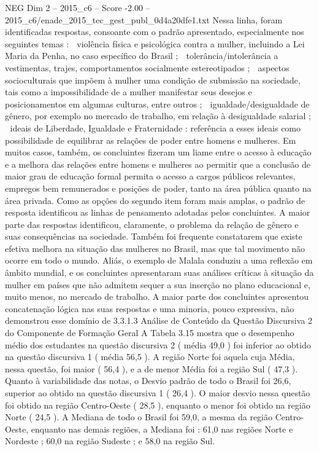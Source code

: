 \begin{textsample}{NEG Dim 2 – 2015\_c6 – Score -2.00 – 2015\_c6/enade\_2015\_tec\_gest\_publ\_0d4a20dfe1.txt}
Nessa linha, foram identificadas respostas, consoante com o padrão apresentado, especialmente nos seguintes temas :  violência física e psicológica contra a mulher, incluindo a Lei Maria da Penha, no caso específico do Brasil ;  tolerância/intolerância a vestimentas, trajes, comportamentos socialmente estereotipados ;  aspectos socioculturais que impõem à mulher uma condição de submissão na sociedade, tais como a impossibilidade de a mulher manifestar seus desejos e posicionamentos em algumas culturas, entre outros ;  igualdade/desigualdade de gênero, por exemplo no mercado de trabalho, em relação à desigualdade salarial ;  ideais de Liberdade, Igualdade e Fraternidade : referência a esses ideais como possibilidade de equilibrar as relações de poder entre homens e mulheres.
Em muitos casos, também, os concluintes fizeram um liame entre o acesso à educação e a melhora das relações entre homens e mulheres ao permitir que a conclusão de maior grau de educação formal permita o acesso a cargos públicos relevantes, empregos bem remunerados e posições de poder, tanto na área pública quanto na área privada.
Como as opções do segundo item foram mais amplas, o padrão de resposta identificou as linhas de pensamento adotadas pelos concluintes.
A maior parte das respostas identificou, claramente, o problema da relação de gênero e suas consequências na sociedade.
Também foi frequente constatarem que existe efetiva melhora na situação das mulheres no Brasil, mas que tal movimento não ocorre em todo o mundo.
Aliás, o exemplo de Malala conduziu a uma reflexão em âmbito mundial, e os concluintes apresentaram suas análises críticas à situação da mulher em países que não admitem sequer a sua inserção no plano educacional e, muito menos, no mercado de trabalho.
A maior parte dos concluintes apresentou concatenação lógica nas suas respostas e uma minoria, pouco expressiva, não demonstrou esse domínio de 3.3.1.3 Análise de Conteúdo da Questão Discursiva 2 do Componente de Formação Geral A Tabela 3.15 mostra que o desempenho médio dos estudantes na questão discursiva 2 ( média 49,0 ) foi inferior ao obtido na questão discursiva 1 ( média 56,5 ).
A região Norte foi aquela cuja Média, nessa questão, foi maior ( 56,4 ), e a de menor Média foi a região Sul ( 47,3 ).
Quanto à variabilidade das notas, o Desvio padrão de todo o Brasil foi 26,6, superior ao obtido na questão discursiva 1 ( 26,4 ).
O maior desvio nessa questão foi obtido na região Centro-Oeste ( 28,5 ), enquanto o menor foi obtido na região Norte ( 24,5 ).
A Mediana de todo o Brasil foi 59,0, a mesma da região Centro-Oeste, enquanto nas demais regiões, a Mediana foi : 61,0 nas regiões Norte e Nordeste ; 60,0 na região Sudeste ; e 58,0 na região Sul.

\end{textsample}
